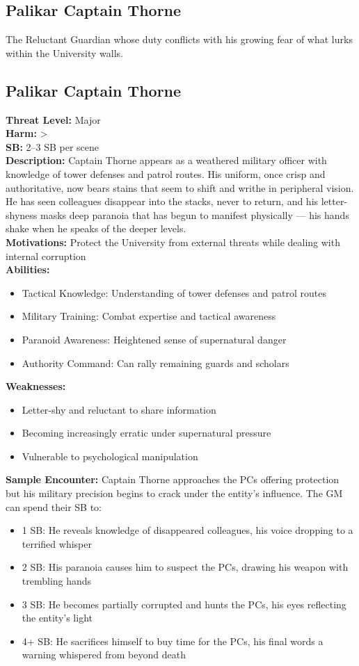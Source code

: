 \documentclass[11pt]{article}
\newenvironment{monsterentry}[1]{%
  \begin{mdframed}[backgroundcolor=shadecolor, linewidth=0pt, leftmargin=0pt, rightmargin=0pt]%
  \subsection*{#1}%
}{%
  \end{mdframed}%
}
\begin{document}
\subsection{Palikar Captain Thorne}

The Reluctant Guardian whose duty conflicts with his growing fear of what lurks within the University walls.

\begin{monsterentry}{Palikar Captain Thorne}
\textbf{Threat Level:} Major \\
\textbf{Harm:} \textgreater \\
\textbf{SB:} 2–3 SB per scene \\
\textbf{Description:} Captain Thorne appears as a weathered military officer with knowledge of tower defenses and patrol routes. His uniform, once crisp and authoritative, now bears stains that seem to shift and writhe in peripheral vision. He has seen colleagues disappear into the stacks, never to return, and his letter-shyness masks deep paranoia that has begun to manifest physically — his hands shake when he speaks of the deeper levels. \\
\textbf{Motivations:} Protect the University from external threats while dealing with internal corruption \\
\textbf{Abilities:}
\begin{itemize}
    \item Tactical Knowledge: Understanding of tower defenses and patrol routes
    \item Military Training: Combat expertise and tactical awareness
    \item Paranoid Awareness: Heightened sense of supernatural danger
    \item Authority Command: Can rally remaining guards and scholars
\end{itemize}
\textbf{Weaknesses:}
\begin{itemize}
    \item Letter-shy and reluctant to share information
    \item Becoming increasingly erratic under supernatural pressure
    \item Vulnerable to psychological manipulation
\end{itemize}
\textbf{Sample Encounter:} Captain Thorne approaches the PCs offering protection but his military precision begins to crack under the entity's influence. The GM can spend their SB to:
\begin{itemize}
    \item 1 SB: He reveals knowledge of disappeared colleagues, his voice dropping to a terrified whisper
    \item 2 SB: His paranoia causes him to suspect the PCs, drawing his weapon with trembling hands
    \item 3 SB: He becomes partially corrupted and hunts the PCs, his eyes reflecting the entity's light
    \item 4+ SB: He sacrifices himself to buy time for the PCs, his final words a warning whispered from beyond death
\end{itemize}
\end{monsterentry}
\end{document}
